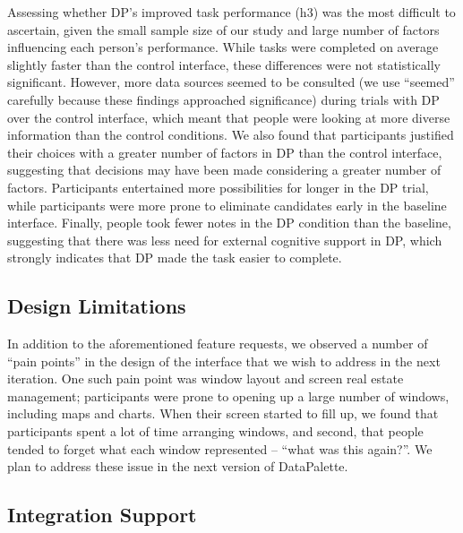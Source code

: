 \documentclass{sigchi}
\begin{document}
Assessing whether DP's improved task performance (h3) was the most difficult to ascertain, given the small sample size of our study and large number of factors influencing each person's performance.  While tasks were completed on average slightly faster than the control interface, these differences were not statistically significant.  However, more data sources seemed to be consulted (we use ``seemed'' carefully because these findings approached significance) during trials with DP over the control interface, which meant that people were looking at more diverse information than the control conditions.  We also found that participants justified their choices with a greater number of factors in DP than the control interface, suggesting that decisions may have been made considering a greater number of factors.  Participants entertained more possibilities for longer in the DP trial, while participants were more prone to eliminate candidates early in the baseline interface.  Finally, people took fewer notes in the DP condition than the baseline, suggesting that there was less need for external cognitive support in DP, which strongly indicates that DP made the task easier to complete.

\subsection{Design Limitations}

In addition to the aforementioned feature requests, we observed a number of ``pain points'' in the design of the interface that we wish to address in the next iteration.  One such pain point was window layout and screen real estate management; participants were prone to opening up a large number of windows, including maps and charts.  When their screen started to fill up, we found that participants spent a lot of time arranging windows, and second, that people tended to forget what each window represented -- ``what was this again?''.  We plan to address these issue in the next version of DataPalette. 

\subsection{Integration Support}
\end{document}
